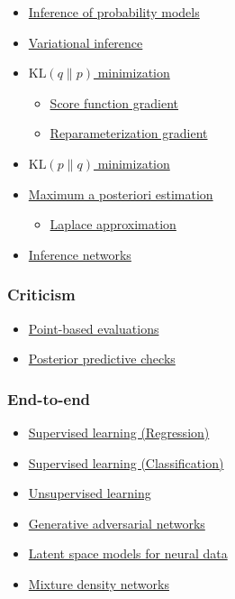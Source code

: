 \begin{itemize}
  \item \href{inference}{Inference of probability models}
  \item \href{variational-inference}{Variational inference}
  \item \href{klqp}{$\text{KL}(q\|p)$ minimization}
  \begin{itemize}
    \item \href{klqp-score}{Score function gradient}
    \item \href{klqp-reparam}{Reparameterization gradient}
  \end{itemize}
  \item \href{klpq}{$\text{KL}(p\|q)$ minimization}
  \item \href{map}{Maximum a posteriori estimation}
  \begin{itemize}
    \item \href{map-laplace}{Laplace approximation}
  \end{itemize}
  \item \href{inference-networks}{Inference networks}
\end{itemize}

\subsubsection{Criticism}

\begin{itemize}
  \item \href{point-evaluation}{Point-based evaluations}
  \item \href{ppc}{Posterior predictive checks}
\end{itemize}

\subsubsection{End-to-end}

\begin{itemize}
  \item \href{supervised-regression}{Supervised learning (Regression)}
  \item \href{supervised-classification}{Supervised learning (Classification)}
  \item \href{unsupervised}{Unsupervised learning}
  \item \href{gan}{Generative adversarial networks}
  \item \href{latent-space-models}{Latent space models for neural data}
  \item \href{mixture-density-network}{Mixture density networks}
\end{itemize}
